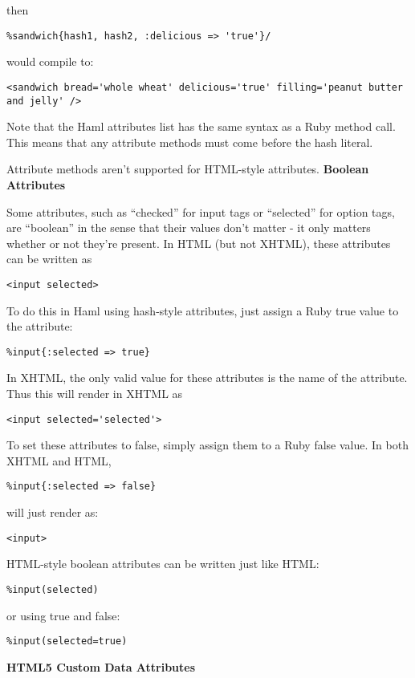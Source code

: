 \documentclass[9pt]{article}
\begin{document}
 then
\begin{verbatim}
%sandwich{hash1, hash2, :delicious => 'true'}/
\end{verbatim}


 would compile to:
\begin{verbatim}
<sandwich bread='whole wheat' delicious='true' filling='peanut butter and jelly' />
\end{verbatim}


 Note that the Haml attributes list has the same syntax as a Ruby method call. This means that any attribute methods must come before the hash literal.


 Attribute methods aren’t supported for HTML-style attributes.
\textbf{Boolean Attributes}


 Some attributes, such as “checked” for input tags or “selected” for option tags, are “boolean” in the sense that their values don’t matter - it only matters whether or not they’re present. In HTML (but not XHTML), these attributes can be written as
\begin{verbatim}
<input selected>
\end{verbatim}


 To do this in Haml using hash-style attributes, just assign a Ruby true value to the attribute:
\begin{verbatim}
%input{:selected => true}
\end{verbatim}


 In XHTML, the only valid value for these attributes is the name of the attribute. Thus this will render in XHTML as
\begin{verbatim}
<input selected='selected'>
\end{verbatim}


 To set these attributes to false, simply assign them to a Ruby false value. In both XHTML and HTML,
\begin{verbatim}
%input{:selected => false}
\end{verbatim}


 will just render as:
\begin{verbatim}
<input>
\end{verbatim}


 HTML-style boolean attributes can be written just like HTML:
\begin{verbatim}
%input(selected)
\end{verbatim}


 or using true and false:
\begin{verbatim}
%input(selected=true)
\end{verbatim}
\textbf{HTML5 Custom Data Attributes}
\end{document}
